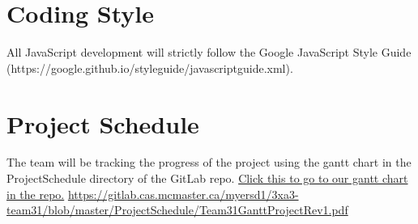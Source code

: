 \documentclass{article}
\begin{document}
\section{Coding Style}
All JavaScript development will strictly follow the Google JavaScript Style Guide (https://google.github.io/styleguide/javascriptguide.xml).

\section{Project Schedule}
The team will be tracking the progress of the project using the gantt chart in the ProjectSchedule directory of the GitLab repo.
\newline
\href{https://gitlab.cas.mcmaster.ca/myersd1/3xa3-team31/blob/master/ProjectSchedule/Team31GanttProjectRev1.pdf}{Click this to go to our gantt chart in the repo.}
\newline
\url{https://gitlab.cas.mcmaster.ca/myersd1/3xa3-team31/blob/master/ProjectSchedule/Team31GanttProjectRev1.pdf}

\end{document}
